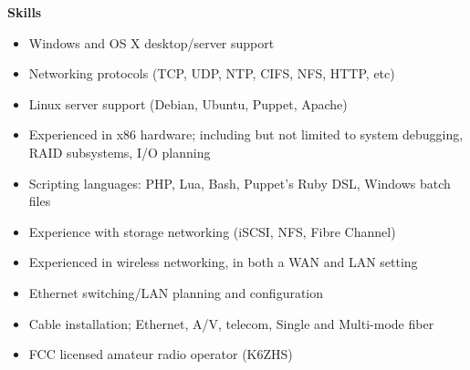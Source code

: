 \documentclass{article}
\newcommand{\skills}[1]{
\heading{Skills}
\makebox[0.25in][l]{}
\begin{minipage}[t]{7.00in}\small{#1}\end{minipage}
\\
}
\newcommand{\heading}[1]{
\noindent\textbf{#1}
\\
}
\begin{document}
\skills{
    \begin{itemize}\itemsep0em\footnotesize
        \item Windows and OS X desktop/server support
        \item Networking protocols (TCP, UDP, NTP, CIFS, NFS, HTTP, etc)
        \item Linux server support (Debian, Ubuntu, Puppet, Apache)
        \item Experienced in x86 hardware; including but not limited to system debugging,
        RAID subsystems, I/O planning
        \item Scripting languages: PHP, Lua, Bash, Puppet's Ruby DSL, Windows batch files
        \item Experience with storage networking (iSCSI, NFS, Fibre Channel)
        \item Experienced in wireless networking, in both a WAN and LAN setting
        \item Ethernet switching/LAN planning and configuration
        \item Cable installation; Ethernet, A/V, telecom, Single and Multi-mode fiber
        \item FCC licensed amateur radio operator (K6ZHS)
    \end{itemize}
}
\end{document}
